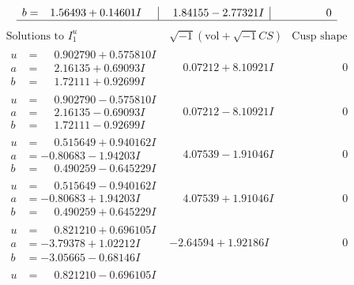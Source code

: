 \documentclass[1p]{elsarticle_modified}
\theoremstyle{definition}
\newcommand{\I}{\sqrt{-1}}
\begin{document}
$$\begin{array}{c|c|c}
\begin{aligned}
b &= \phantom{-}1.56493 + 0.14601 I\end{aligned}
 & \phantom{-}1.84155 - 2.77321 I & \phantom{-0.000000 } 0\\
 \hline 
 \end{array}$$\newpage$$\begin{array}{c|c|c}  
\text{Solutions to }I^u_{1}& \I (\text{vol} + \sqrt{-1}CS) & \text{Cusp shape}\\
 \hline 
\begin{aligned}
u &= \phantom{-}0.902790 + 0.575810 I \\
a &= \phantom{-}2.16135 + 0.69093 I \\
b &= \phantom{-}1.72111 + 0.92699 I\end{aligned}
 & \phantom{-}0.07212 + 8.10921 I & \phantom{-0.000000 } 0 \\ \hline\begin{aligned}
u &= \phantom{-}0.902790 - 0.575810 I \\
a &= \phantom{-}2.16135 - 0.69093 I \\
b &= \phantom{-}1.72111 - 0.92699 I\end{aligned}
 & \phantom{-}0.07212 - 8.10921 I & \phantom{-0.000000 } 0 \\ \hline\begin{aligned}
u &= \phantom{-}0.515649 + 0.940162 I \\
a &= -0.80683 - 1.94203 I \\
b &= \phantom{-}0.490259 - 0.645229 I\end{aligned}
 & \phantom{-}4.07539 - 1.91046 I & \phantom{-0.000000 } 0 \\ \hline\begin{aligned}
u &= \phantom{-}0.515649 - 0.940162 I \\
a &= -0.80683 + 1.94203 I \\
b &= \phantom{-}0.490259 + 0.645229 I\end{aligned}
 & \phantom{-}4.07539 + 1.91046 I & \phantom{-0.000000 } 0 \\ \hline\begin{aligned}
u &= \phantom{-}0.821210 + 0.696105 I \\
a &= -3.79378 + 1.02212 I \\
b &= -3.05665 - 0.68146 I\end{aligned}
 & -2.64594 + 1.92186 I & \phantom{-0.000000 } 0 \\ \hline\begin{aligned}
u &= \phantom{-}0.821210 - 0.696105 I \\

\end{aligned}
\end{array}$$
\end{document}
